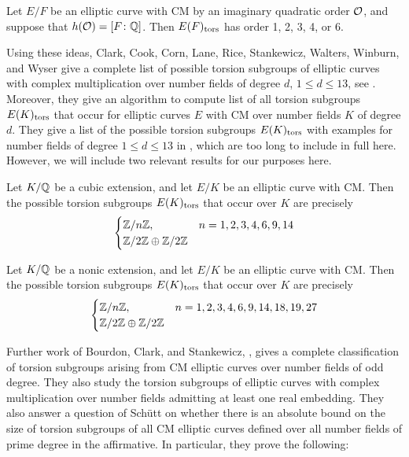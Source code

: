 \begin{thm}
Let $E/F$ be an elliptic curve with CM by an imaginary quadratic order $\mathcal{O}$, and suppose that $h(\mathcal{O})= [F \colon \mathbb{Q}]$. Then $E(F)_{\text{tors}}$ has order 1, 2, 3, 4, or 6.
\end{thm}


Using these ideas, Clark, Cook, Corn, Lane, Rice, Stankewicz, Walters, Winburn, and Wyser give a complete list of possible torsion subgroups of elliptic curves with complex multiplication over number fields of degree $d$, $1 \leq d \leq 13$, see \cite{clarkcornricestankewicz14}. Moreover, they give an algorithm to compute list of all torsion subgroups $E(K)_{\text{tors}}$ that occur for elliptic curves $E$ with CM over number fields $K$ of degree $d$. They give a list of the possible torsion subgroups $E(K)_{\text{tors}}$ with examples for number fields of degree $1 \leq d \leq 13$ in \cite[Sec.~4]{clarkcornricestankewicz14}, which are too long to include in full here. However, we will include two relevant results for our purposes here.


\begin{thm}
Let $K/\mathbb{Q}$ be a cubic extension, and let $E/K$ be an elliptic curve with CM. Then the possible torsion subgroups $E(K)_{\text{tors}}$ that occur over $K$ are precisely
	\[
	\begin{cases}
	\mathbb{Z}/n\mathbb{Z}, & n= 1, 2, 3, 4, 6, 9, 14 \\
	\mathbb{Z}/2\mathbb{Z} \oplus \mathbb{Z}/2\mathbb{Z}
	\end{cases}
	\]
\end{thm}


\begin{thm} \label{thm:noniccmbound}
Let $K/\mathbb{Q}$ be a nonic extension, and let $E/K$ be an elliptic curve with CM. Then the possible torsion subgroups $E(K)_{\text{tors}}$ that occur over $K$ are precisely
	\[
	\begin{cases}
	\mathbb{Z}/n\mathbb{Z}, & n= 1, 2, 3, 4, 6, 9, 14, 18, 19, 27 \\
	\mathbb{Z}/2\mathbb{Z} \oplus \mathbb{Z}/2\mathbb{Z}
	\end{cases}
	\]
\end{thm}


Further work of Bourdon, Clark, and Stankewicz, \cite{bourdonclarkstankewicz17}, gives a complete classification of torsion subgroups arising from CM elliptic curves over number fields of odd degree. They also study the torsion subgroups of elliptic curves with complex multiplication over number fields admitting at least one real embedding. They also answer a question of Sch\"utt on whether there is an absolute bound on the size of torsion subgroups of all CM elliptic curves defined over all number fields of prime degree in the affirmative. In particular, they prove the following:



